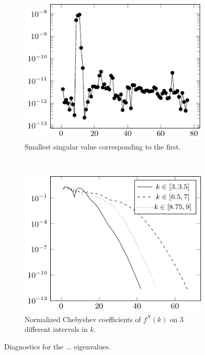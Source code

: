 \begin{figure}
  \centering
  \begin{subfigure}[t]{0.4\textwidth}
    \centering
    \includegraphics[width=\textwidth]{fig/ex_many_holes_004_sings_plot}
    \caption{Smallest singular value corresponding to the
    first.}
    \label{subfig:many_inclusions_sings}
  \end{subfigure}
  ~
  \begin{subfigure}[t]{0.4\textwidth}
    \centering
    \includegraphics[width=\textwidth]{fig/ex_many_holes_004_coeffs_plot}
    \caption{Normalized Chebyshev coefficients of $f^N(k)$ on
      3 different intervals in $k$.}
    \label{subfig:many_inclusions_coeffs}
  \end{subfigure}
  \caption{Diagnostics for the ... eigenvalues.}
  \label{fig:many_inclusions_diagnostics}
\end{figure}

